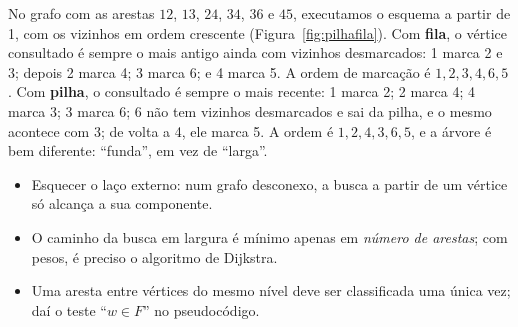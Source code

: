 \begin{exemplo}\label{ex:pilhafila}
No grafo com as arestas $12$, $13$, $24$, $34$, $36$ e $45$, executamos o esquema a partir de 1, com os vizinhos em ordem crescente (Figura~\ref{fig:pilhafila}). Com \textbf{fila}, o vértice consultado é sempre o mais antigo ainda com vizinhos desmarcados: 1 marca 2 e 3; depois 2 marca 4; 3 marca 6; e 4 marca 5. A ordem de marcação é $1,2,3,4,6,5$. Com \textbf{pilha}, o consultado é sempre o mais recente: 1 marca 2; 2 marca 4; 4 marca 3; 3 marca 6; 6 não tem vizinhos desmarcados e sai da pilha, e o mesmo acontece com 3; de volta a 4, ele marca 5. A ordem é $1,2,4,3,6,5$, e a árvore é bem diferente: ``funda'', em vez de ``larga''.
\begin{figura}
\end{figura}
\end{exemplo}

\begin{cuidado}
\begin{itemize}
  \item Esquecer o laço externo: num grafo desconexo, a busca a partir de um vértice só alcança a sua componente.
  \item O caminho da busca em largura é mínimo apenas em \emph{número de arestas}; com pesos, é preciso o algoritmo de Dijkstra.
  \item Uma aresta entre vértices do mesmo nível deve ser classificada uma única vez; daí o teste ``$w\in F$'' no pseudocódigo.
\end{itemize}
\end{cuidado}

